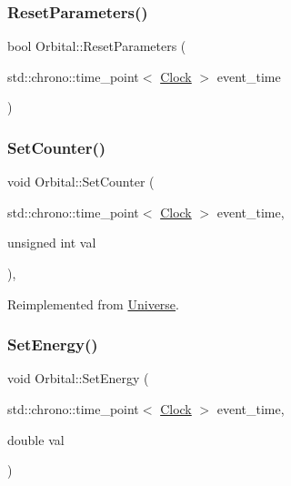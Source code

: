 \mbox{\label{classOrbital_acc6137a5a79be91a255f685a2f065330}} 
\subsubsection{\texorpdfstring{Reset\+Parameters()}{ResetParameters()}}
{\footnotesize\ttfamily bool Orbital\+::\+Reset\+Parameters (\begin{DoxyParamCaption}\item[{std\+::chrono\+::time\+\_\+point$<$ \mbox{\hyperlink{universe_8h_a0ef8d951d1ca5ab3cfaf7ab4c7a6fd80}{Clock}} $>$}]{event\+\_\+time }\end{DoxyParamCaption})}

\mbox{\label{classOrbital_ae2a2fb06700d1d68501b0cbdea87cc08}} 
\subsubsection{\texorpdfstring{Set\+Counter()}{SetCounter()}}
{\footnotesize\ttfamily void Orbital\+::\+Set\+Counter (\begin{DoxyParamCaption}\item[{std\+::chrono\+::time\+\_\+point$<$ \mbox{\hyperlink{universe_8h_a0ef8d951d1ca5ab3cfaf7ab4c7a6fd80}{Clock}} $>$}]{event\+\_\+time,  }\item[{unsigned int}]{val }\end{DoxyParamCaption})\hspace{0.3cm}{\ttfamily [inline]}, {\ttfamily [virtual]}}



Reimplemented from \mbox{\hyperlink{classUniverse_aa22202ae740eb1355529afcb13285e91}{Universe}}.

\mbox{\label{classOrbital_a20b0f4d549fd9024df89603a5adcc214}} 
\subsubsection{\texorpdfstring{Set\+Energy()}{SetEnergy()}}
{\footnotesize\ttfamily void Orbital\+::\+Set\+Energy (\begin{DoxyParamCaption}\item[{std\+::chrono\+::time\+\_\+point$<$ \mbox{\hyperlink{universe_8h_a0ef8d951d1ca5ab3cfaf7ab4c7a6fd80}{Clock}} $>$}]{event\+\_\+time,  }\item[{double}]{val }\end{DoxyParamCaption})\hspace{0.3cm}{\ttfamily [inline]}}

